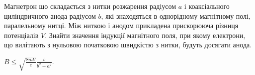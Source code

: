\begin{problem}
Магнетрон що складається з нитки розжарення радіусом $a$ і коаксіального циліндричного анода радіусом $b$, які знаходяться в однорідному магнітному полі, паралельному нитці. Між ниткою і анодом прикладена прискорююча різниця потенціалів $V$. Знайти значення індукції магнітного
поля, при якому електрони, що вилітають з нульовою початковою швидкістю з нитки, будуть досягати анода.
\begin{solution}
	$B \le \sqrt{\frac{8mV}{e}} \frac{b}{b^2 - a^2}$.
\end{solution}
\end{problem}


